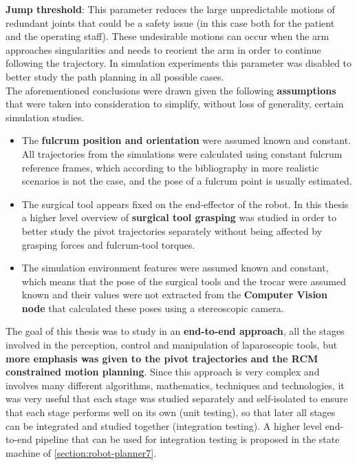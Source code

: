 \textbf{Jump threshold}: This parameter reduces the large unpredictable motions of redundant joints that could be a safety issue (in this case both for the patient and the operating staff). These undesirable motions can occur when the arm approaches singularities and needs to reorient the arm in order to continue following the trajectory. In simulation experiments this parameter was disabled to better study the path planning in all possible cases.\\

The aforementioned conclusions were drawn given the following \textbf{assumptions} that were taken into consideration to simplify, without loss of generality, certain simulation studies. 
\begin{itemize}
\item The \textbf{fulcrum position and orientation} were assumed known and constant. All trajectories from the simulations were calculated using constant fulcrum reference frames, which according to the bibliography in more realistic scenarios is not the case, and the pose of a fulcrum point is usually estimated.
\item The surgical tool appears fixed on the end-effector of the robot. In this thesis a higher level overview of \textbf{surgical tool grasping} was studied in order to better study the pivot trajectories separately without being affected by grasping forces and fulcrum-tool torques.
\item The simulation environment features were assumed known and constant, which means that the pose of the surgical tools and the trocar were assumed known and their values were not extracted from the \textbf{Computer Vision node} that calculated these poses using a stereoscopic camera.
\end{itemize}

The goal of this thesis was to study in an \textbf{end-to-end approach}, all the stages involved in the perception, control and manipulation of laparoscopic tools, but \textbf{more emphasis was given to the pivot 
trajectories and the RCM constrained motion planning}. Since this approach is very complex and involves many different algorithms, mathematics, techniques and technologies, it was very useful that each stage was studied separately and self-isolated to ensure that each stage performs well on its own (unit testing), so that later all stages can be integrated and studied together (integration testing). A higher level end-to-end pipeline that can be used for integration testing is proposed in the state machine of \ref{section:robot-planner7}. \\
%
